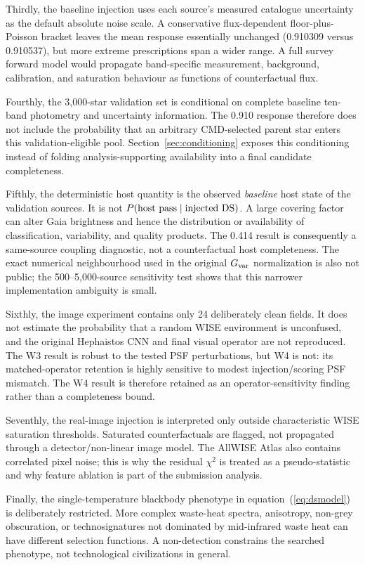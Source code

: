 \documentclass[fleqn,usenatbib]{mnras}
\begin{document}
Thirdly, the baseline injection uses each source's measured catalogue uncertainty as the default absolute noise scale. A conservative flux-dependent floor-plus-Poisson bracket leaves the mean response essentially unchanged (0.910309 versus 0.910537), but more extreme prescriptions span a wider range. A full survey forward model would propagate band-specific measurement, background, calibration, and saturation behaviour as functions of counterfactual flux.

Fourthly, the 3,000-star validation set is conditional on complete baseline ten-band photometry and uncertainty information. The 0.910 response therefore does not include the probability that an arbitrary CMD-selected parent star enters this validation-eligible pool. Section~\ref{sec:conditioning} exposes this conditioning instead of folding analysis-supporting availability into a final candidate completeness.

Fifthly, the deterministic host quantity is the observed \emph{baseline} host state of the validation sources. It is not $P({\rm host\ pass}\mid{\rm injected\ DS})$. A large covering factor can alter Gaia brightness and hence the distribution or availability of classification, variability, and quality products. The 0.414 result is consequently a same-source coupling diagnostic, not a counterfactual host completeness. The exact numerical neighbourhood used in the original $G_{\rm var}$ normalization is also not public; the 500--5,000-source sensitivity test shows that this narrower implementation ambiguity is small.

Sixthly, the image experiment contains only 24 deliberately clean fields. It does not estimate the probability that a random WISE environment is unconfused, and the original Hephaistos CNN and final visual operator are not reproduced. The W3 result is robust to the tested PSF perturbations, but W4 is not: its matched-operator retention is highly sensitive to modest injection/scoring PSF mismatch. The W4 result is therefore retained as an operator-sensitivity finding rather than a completeness bound.

Seventhly, the real-image injection is interpreted only outside characteristic WISE saturation thresholds. Saturated counterfactuals are flagged, not propagated through a detector/non-linear image model. The AllWISE Atlas also contains correlated pixel noise; this is why the residual $\chi^2$ is treated as a pseudo-statistic and why feature ablation is part of the submission analysis.

Finally, the single-temperature blackbody phenotype in equation~(\ref{eq:dsmodel}) is deliberately restricted. More complex waste-heat spectra, anisotropy, non-grey obscuration, or technosignatures not dominated by mid-infrared waste heat can have different selection functions. A non-detection constrains the searched phenotype, not technological civilizations in general.
\end{document}
